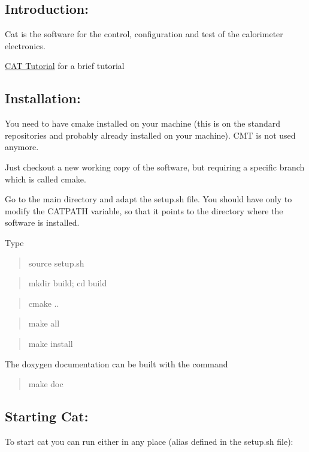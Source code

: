 \subsection*{Introduction\+: }

Cat is the software for the control, configuration and test of the calorimeter electronics.

\hyperlink{tutorial}{C\+AT Tutorial} for a brief tutorial

\subsection*{Installation\+: }

You need to have cmake installed on your machine (this is on the standard repositories and probably already installed on your machine). C\+MT is not used anymore.

Just checkout a new working copy of the software, but requiring a specific branch which is called cmake.

Go to the main directory and adapt the setup.\+sh file. You should have only to modify the C\+A\+T\+P\+A\+TH variable, so that it points to the directory where the software is installed.

Type

\begin{quote}
source setup.\+sh \end{quote}


\begin{quote}
mkdir build; cd build \end{quote}


\begin{quote}
cmake .. \end{quote}


\begin{quote}
make all \end{quote}


\begin{quote}
make install \end{quote}
The doxygen documentation can be built with the command

\begin{quote}
make doc \end{quote}


\subsection*{Starting Cat\+: }

To start cat you can run either in any place (alias defined in the setup.\+sh file)\+:

